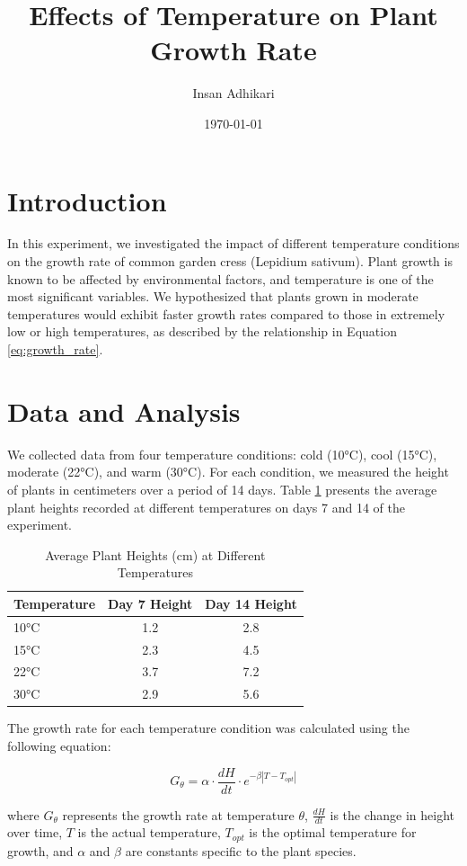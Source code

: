 \documentclass{article}
\title{Effects of Temperature on Plant Growth Rate}
\author{Insan Adhikari}
\date{\today}
\begin{document}
\maketitle

\section{Introduction}
In this experiment, we investigated the impact of different temperature conditions on the growth rate of common garden cress (Lepidium sativum). Plant growth is known to be affected by environmental factors, and temperature is one of the most significant variables. We hypothesized that plants grown in moderate temperatures would exhibit faster growth rates compared to those in extremely low or high temperatures, as described by the relationship in Equation \ref{eq:growth_rate}.

\section{Data and Analysis}
We collected data from four temperature conditions: cold (10°C), cool (15°C), moderate (22°C), and warm (30°C). For each condition, we measured the height of plants in centimeters over a period of 14 days. Table \ref{tab:growth_data} presents the average plant heights recorded at different temperatures on days 7 and 14 of the experiment.

\begin{table}[h]
\centering
\caption{Average Plant Heights (cm) at Different Temperatures}
\label{tab:growth_data}
\begin{tabular}{lcc}
\toprule
Temperature & Day 7 Height & Day 14 Height \\
\midrule
10°C & 1.2 & 2.8 \\
15°C & 2.3 & 4.5 \\
22°C & 3.7 & 7.2 \\
30°C & 2.9 & 5.6 \\
\bottomrule
\end{tabular}
\end{table}

The growth rate for each temperature condition was calculated using the following equation:

\begin{equation}
\label{eq:growth_rate}
G_{\theta} = \alpha \cdot \frac{dH}{dt} \cdot e^{-\beta|T-T_{opt}|}
\end{equation}

where $G_{\theta}$ represents the growth rate at temperature $\theta$, $\frac{dH}{dt}$ is the change in height over time, $T$ is the actual temperature, $T_{opt}$ is the optimal temperature for growth, and $\alpha$ and $\beta$ are constants specific to the plant species.
\end{document}

